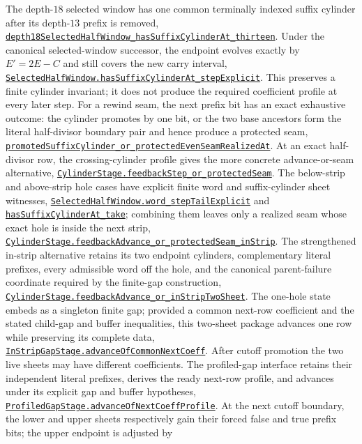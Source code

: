 \documentclass[11pt]{article}
\newcommand{\commit}{81150c1c6fdd4cd51e76d3aa0de344341e0e9e7c}
\newcommand{\repobase}{https://github.com/wcook04/plectis-lean-erdos249-257/blob/\commit}
\newcommand{\PK}{Erdos249257}
\newcommand{\lref}[3]{\href{\repobase/\PK/#1\#L#2}{\nolinkurl{#3}}}
\newcommand{\lrefx}[3]{\href{\repobase/\PK/#1\#L#2}{\nolinkurl{#3}}}
\theoremstyle{definition}
\theoremstyle{remark}
\begin{document}
The depth-$18$ selected window has one common terminally indexed suffix
cylinder after its depth-$13$ prefix is removed,
\lref{SelectedSuffixCylinder.lean}{88}{depth18SelectedHalfWindow_hasSuffixCylinderAt_thirteen}.
Under the canonical selected-window successor, the endpoint evolves exactly by
$E' = 2E-C$ and still covers the new carry interval,
\lrefx{SelectedSuffixCylinder.lean}{136}{SelectedHalfWindow.hasSuffixCylinderAt_stepExplicit}.
This preserves a finite cylinder invariant; it does not produce the required
coefficient profile at every later step.  For a rewind seam, the next prefix
bit has an exact exhaustive outcome: the cylinder promotes by one bit, or the
two base ancestors form the literal half-divisor boundary pair and hence
produce a protected seam,
\lrefx{SuffixCylinderPromotion.lean}{322}{promotedSuffixCylinder_or_protectedEvenSeamRealizedAt}.
At an exact half-divisor row, the crossing-cylinder profile gives the more
concrete advance-or-seam alternative,
\lrefx{SuffixCylinderGlobalProducer.lean}{174}{CylinderStage.feedbackStep_or_protectedSeam}.
The below-strip and above-strip hole cases have explicit finite word and
suffix-cylinder sheet witnesses,
\lrefx{SuffixCylinderBelow.lean}{117}{SelectedHalfWindow.word_stepTailExplicit}
and
\lrefx{SuffixCylinderTwoSheet.lean}{26}{hasSuffixCylinderAt_take}; combining
them leaves only a realized seam whose exact hole is inside the next strip,
\lrefx{SuffixCylinderFeedbackFanIn.lean}{62}{CylinderStage.feedbackAdvance_or_protectedSeam_inStrip}.
The strengthened in-strip alternative retains its two endpoint cylinders,
complementary literal prefixes, every admissible word off the hole, and the
canonical parent-failure coordinate required by the finite-gap construction,
\lrefx{SuffixCylinderInStrip.lean}{665}{CylinderStage.feedbackAdvance_or_inStripTwoSheet}.
The one-hole state embeds as a singleton finite gap; provided a common
next-row coefficient and the stated child-gap and buffer inequalities, this
two-sheet package advances one row while preserving its complete data,
\lrefx{SuffixCylinderFiniteGap.lean}{256}{InStripGapStage.advanceOfCommonNextCoeff}.
After cutoff promotion the two live sheets may have different coefficients.
The profiled-gap interface retains their independent literal prefixes,
derives the ready next-row profile, and advances under its explicit gap and
buffer hypotheses,
\lrefx{SuffixCylinderProfiledGap.lean}{124}{ProfiledGapStage.advanceOfNextCoeffProfile}.
At the next cutoff boundary, the lower and upper sheets respectively gain
their forced false and true prefix bits; the upper endpoint is adjusted by
\end{document}

